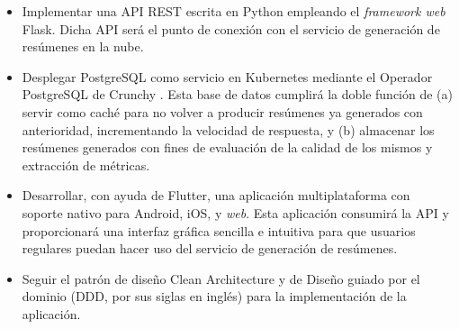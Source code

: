 \begin{itemize}
	\item [\textbullet] Implementar una API REST escrita en Python empleando el \emph{framework web} Flask. Dicha API será el punto de conexión con el servicio de generación de resúmenes en la nube.
	
	\item [\textbullet] Desplegar PostgreSQL como servicio en Kubernetes mediante el Operador PostgreSQL de Crunchy \cite{crunchy21}. Esta base de datos cumplirá la doble función de (a) servir como caché para no volver a producir resúmenes ya generados con anterioridad, incrementando la velocidad de respuesta, y (b) almacenar los resúmenes generados con fines de evaluación de la calidad de los mismos y extracción de métricas.
	
	\item [\textbullet] Desarrollar, con ayuda de Flutter, una aplicación multiplataforma con soporte nativo para Android, iOS, y \emph{web}. Esta aplicación consumirá la API y proporcionará una interfaz gráfica sencilla e intuitiva para que usuarios regulares puedan hacer uso del servicio de generación de resúmenes.
	
	\item [\textbullet] Seguir el patrón de diseño Clean Architecture \cite{martin15} y de Diseño guiado por el dominio (DDD, por sus siglas en inglés) \cite{vernon13} para la implementación de la aplicación.
\end{itemize}